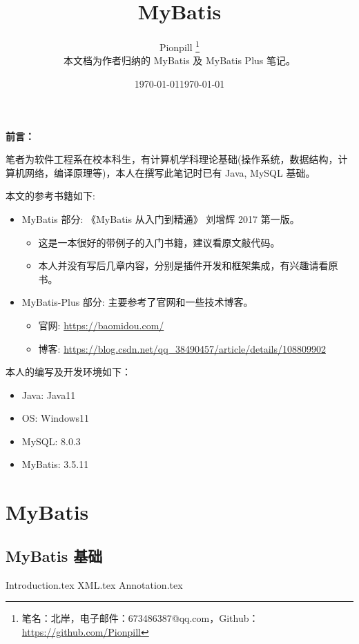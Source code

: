 \documentclass{PionpillNote-book}
\title{MyBatis}
\author{
    Pionpill \footnote{笔名：北岸，电子邮件：673486387@qq.com，Github：\url{https://github.com/Pionpill}} \\
    本文档为作者归纳的 MyBatis 及 MyBatis Plus 笔记。\\
}
\date{\today}
\begin{document}
\pagestyle{plain}
\maketitle

\noindent\textbf{前言：}

笔者为软件工程系在校本科生，有计算机学科理论基础(操作系统，数据结构，计算机网络，编译原理等)，本人在撰写此笔记时已有 Java, MySQL 基础。

本文的参考书籍如下:
\begin{itemize}
    \item MyBatis 部分: 《MyBatis 从入门到精通》 刘增辉 2017 第一版。
    \begin{itemize}
        \item 这是一本很好的带例子的入门书籍，建议看原文敲代码。
        \item 本人并没有写后几章内容，分别是插件开发和框架集成，有兴趣请看原书。
    \end{itemize}
    \item MyBatis-Plus 部分: 主要参考了官网和一些技术博客。
    \begin{itemize}
        \item 官网: \url{https://baomidou.com/}
        \item 博客: \url{https://blog.csdn.net/qq_38490457/article/details/108809902}
    \end{itemize}
\end{itemize}

本人的编写及开发环境如下：
\begin{itemize}
    \item Java: Java11
    \item OS: Windows11 
    \item MySQL: 8.0.3
    \item MyBatis: 3.5.11
\end{itemize}

\date{\today}
\newpage

\tableofcontents

\newpage

\setcounter{page}{1} 
\pagestyle{fancy}

\part{MyBatis}
\chapter{MyBatis 基础}
{Introduction.tex}
{XML.tex}
{Annotation.tex}
\end{document}
